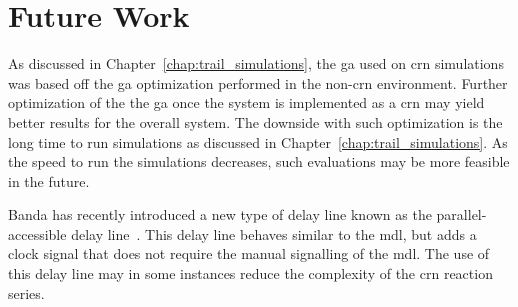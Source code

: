 \section{Future Work}
As discussed in Chapter~\ref{chap:trail_simulations}, the \gls{ga} used on \gls{crn} simulations was based off the \gls{ga} optimization performed in the non-\gls{crn} environment. Further optimization of the the \gls{ga} once the system is implemented as a \gls{crn} may yield better results for the overall system. The downside with such optimization is the long time to run simulations as discussed in Chapter~\ref{chap:trail_simulations}. As the speed to run the simulations decreases, such evaluations may be more feasible in the future. 

Banda has recently introduced a new type of delay line known as the parallel-accessible delay line~\cite{Banda2014-pf}. This delay line behaves similar to the \gls{mdl}, but adds a clock signal that does not require the manual signalling of the \gls{mdl}. The use of this delay line may in some instances reduce the complexity of the \gls{crn} reaction series.





